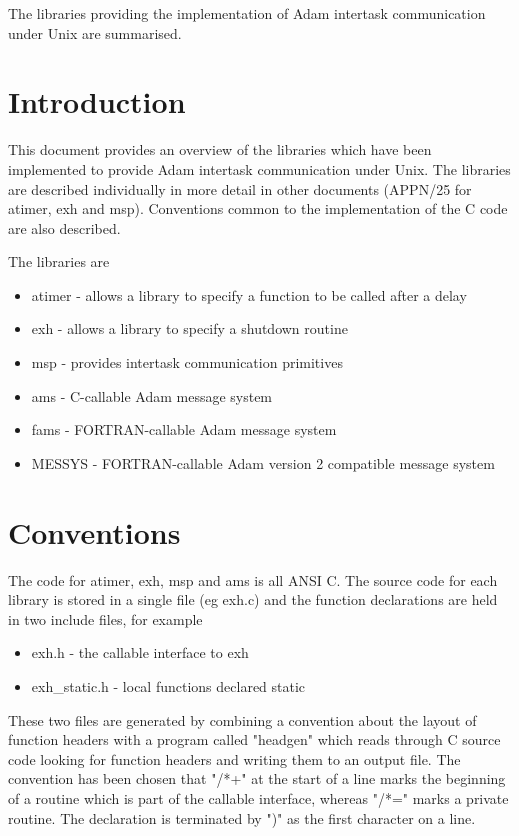 The libraries providing the implementation of Adam intertask
communication under Unix are summarised.


\section {Introduction}

This document provides an overview of the libraries which have been
implemented to provide Adam intertask communication under Unix. The
libraries are described individually in more detail in other documents
(APPN/25 for atimer, exh and msp). Conventions common to the
implementation of the C code are also described.

The libraries are

\begin{itemize}
\item atimer - allows a library to specify a function to be called after a delay
\item exh - allows a library to specify a shutdown routine
\item msp - provides intertask communication primitives
\item ams - C-callable Adam message system
\item fams - FORTRAN-callable Adam message system
\item MESSYS - FORTRAN-callable Adam version 2 compatible message system
\end{itemize}


\section {Conventions}

The code for atimer, exh, msp and ams is all ANSI C. The source code for
each library is stored in a single file (eg exh.c) and the function
declarations are held in two include files, for example

\begin{itemize}
\item exh.h - the callable interface to exh
\item exh\_static.h - local functions declared static
\end{itemize}

These two files are generated by combining a convention about the layout
of function headers with a program called "headgen" which reads through C
source code looking for function headers and writing them to an output
file. The convention has been chosen that "/*+" at the start of a line
marks the beginning of a routine which is part of the callable interface,
whereas "/*=" marks a private routine. The declaration is terminated by
")" as the first character on a line.

